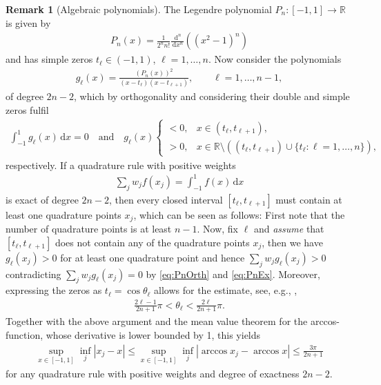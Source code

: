 \documentclass[11pt,a4paper,twoside,final,biblatex]{scrartcl}
\newcommand{\R}{\ensuremath{\mathbb{R}}}
\renewcommand{\d}{\,\mathrm{d}}
\theoremstyle{definition}
\newtheorem{remark}[theorem]{Remark}
\numberwithin{equation}{section}
\numberwithin{table}{section}
\numberwithin{figure}{section}
\begin{document}
\begin{remark}[Algebraic polynomials]
 The Legendre polynomial $P_n\colon[-1,1]\to\R$ is given by
 \begin{align*}
     P_n(x)=\frac{1}{2^n n!}\frac{\d^n}{\d x^n}\left(\left(x^2-1\right)^n\right)
 \end{align*}
 and has simple zeros $t_\ell\in(-1,1)$, $\ell=1,\hdots,n$.
 Now consider the polynomials
 \begin{align*}
  g_\ell(x)=\frac{(P_n(x))^2}{(x-t_\ell)(x-t_{\ell+1})},\qquad \ell=1,\hdots,n-1,
 \end{align*}
 of degree $2n-2$, which by orthogonality and considering their double and simple zeros fulfil
 \begin{align}\label{eq:PnOrth}
     \int_{-1}^1 g_\ell(x) \d x = 0\quad\text{and}\quad
     g_\ell(x) \begin{cases}< 0,& x\in (t_\ell,t_{\ell+1}),\\
                            > 0,& x\in \R\setminus \left((t_\ell,t_{\ell+1})\cup \{t_\ell:\ell=1,\hdots,n\}\right),
                            \end{cases}
 \end{align}
 respectively.
 If a quadrature rule with positive weights 
 \begin{align}\label{eq:PnEx}
     \sum_{j} w_j f(x_j) = \int_{-1}^1 f(x)\d x
 \end{align}
 is exact of degree $2n-2$, then every closed interval $[t_\ell,t_{\ell+1}]$ must contain at least one quadrature points $x_j$, which can be seen as follows:
 First note that the number of quadrature points is at least $n-1$.
 Now, fix $\ell$ and \emph{assume} that $[t_\ell,t_{\ell+1}]$ does not contain any of the quadrature points $x_j$, then we have $g_\ell(x_j)>0$ for at least one quadrature point and hence
 $    \sum_{j} w_j g_\ell(x_j) > 0$
 contradicting $\sum_{j} w_j g_\ell(x_j)=0$ by \eqref{eq:PnOrth} and \eqref{eq:PnEx}.
 Moreover, expressing the zeros as $t_\ell=\cos\theta_\ell$ allows for the estimate, see, e.g., \cite{Sz36},
 \begin{align*}
     \frac{2\ell-1}{2n+1}\pi < \theta_\ell < \frac{2\ell}{2n+1}\pi.
 \end{align*}
 Together with the above argument and the mean value theorem for the arccos-function, whose derivative is lower bounded by 1, this yields
 \begin{align*}
     \sup_{x\in [-1,1]} \inf_j |x_j-x|
     \le \sup_{x\in [-1,1]} \inf_j|\arccos x_j - \arccos x| \le \frac{3\pi}{2n+1}
 \end{align*}
 for any quadrature rule with positive weights and degree of exactness $2n-2$.
\end{remark}
\end{document}
